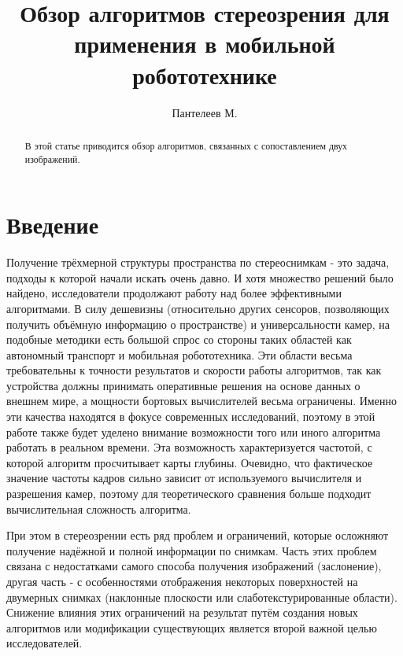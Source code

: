

\raggedbottom
%


\title{Обзор алгоритмов стереозрения для применения в мобильной робототехнике}
\author{Пантелеев М.}
\maketitle

\begin{abstract}
	В этой статье приводится обзор алгоритмов, связанных с сопоставлением двух изображений.
\end{abstract}

\section{Введение}
Получение трёхмерной структуры пространства по стереоснимкам - это задача, подходы к которой начали искать очень давно. И хотя 
множество решений было найдено, исследователи продолжают работу над более эффективными алгоритмами. В силу дешевизны (относительно других сенсоров,
позволяющих получить объёмную информацию о пространстве) и универсальности камер, на подобные методики есть большой спрос со стороны 
таких областей как автономный транспорт и мобильная робототехника. 					%
Эти области весьма требовательны к точности результатов и скорости работы алгоритмов, так как устройства должны принимать оперативные решения на основе 
данных о внешнем мире, а мощности бортовых вычислителей весьма ограничены. Именно эти качества находятся в фокусе современных исследований, поэтому в этой 
работе также будет уделено внимание возможности того или иного алгоритма работать в реальном времени. Эта возможность характеризуется частотой, с которой 
алгоритм просчитывает карты глубины. Очевидно, что фактическое значение частоты кадров сильно зависит от используемого вычислителя и разрешения камер, поэтому 
для теоретического сравнения больше подходит вычислительная сложность алгоритма. 

При этом в стереозрении есть ряд проблем и ограничений, которые осложняют получение надёжной и полной информации по снимкам. Часть этих проблем 
связана с недостатками самого способа получения изображений (заслонение), другая часть - с особенностями отображения некоторых поверхностей на 
двумерных снимках (наклонные плоскости или слаботекстурированные области). Снижение влияния этих 
ограничений на результат путём создания новых алгоритмов или модификации существующих является второй важной целью исследователей. 

